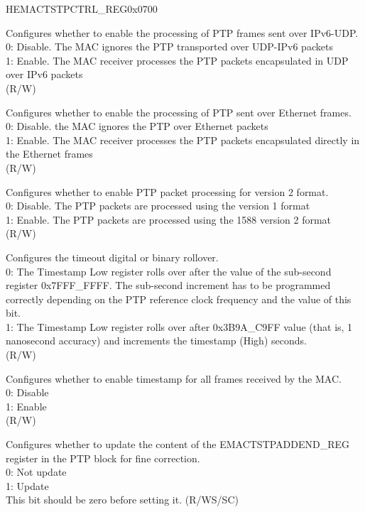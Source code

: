 \addtocounter{Regfloat}{-1}
\begin{register}{H}{EMACTSTPCTRL\_REG}{0x0700}
\begin{regdesc}\begin{reglist}
\item [Continued from the previous page...]

\item [TSIPV6ENA] Configures whether to enable the processing of PTP frames sent over IPv6-UDP.\\
0: Disable. The MAC ignores the PTP transported over UDP-IPv6 packets\\
1: Enable. The MAC receiver processes the PTP packets encapsulated in UDP over IPv6 packets\\ (R/W)
\item [TSIPENA] Configures whether to enable the processing of PTP sent over Ethernet frames.\\
0: Disable. the MAC ignores the PTP over Ethernet packets\\
1: Enable. The MAC receiver processes the PTP packets encapsulated directly in the Ethernet frames\\ (R/W)
\item [TSVER2ENA] Configures whether to enable PTP packet processing for version 2 format.\\
0: Disable. The PTP packets are processed using the version 1 format\\
1: Enable. The PTP packets are processed using the 1588 version 2 format\\ (R/W)
\item [TSCTRLSSR] Configures the timeout digital or binary rollover.\\
0: The Timestamp Low register rolls over after the value of the sub-second register 0x7FFF\_FFFF. The sub-second increment has to be programmed correctly depending on the PTP reference clock frequency and the value of this bit.\\
1: The Timestamp Low register rolls over after 0x3B9A\_C9FF value (that is, 1 nanosecond accuracy) and increments the timestamp (High) seconds.\\
 (R/W)
\item [TSENALL] Configures whether to enable timestamp for all frames received by the MAC.\\
0: Disable\\
1: Enable\\ (R/W)
\item [TSADDREG] Configures whether to update the content of the EMACTSTPADDEND\_REG register in the PTP block for fine correction.\\
0: Not update\\
1: Update\\
This bit should be zero before setting it. (R/WS/SC)

\item [Continued on the next page...]
\end{reglist}\end{regdesc}
\end{register}

